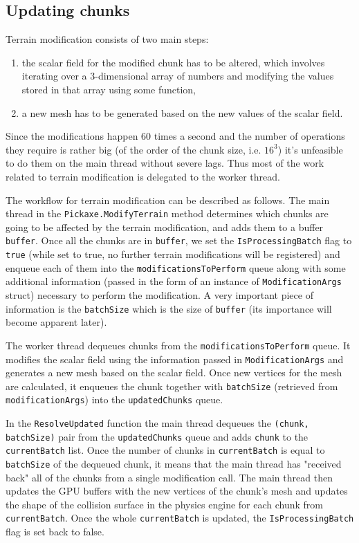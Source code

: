 \subsection{Updating chunks}
Terrain modification consists of two main steps:
\begin{enumerate}
    \item the scalar field for the modified chunk has to be altered, which involves iterating over a 3-dimensional array of numbers and modifying the values stored in that array using some function,
    \item a new mesh has to be generated based on the new values of the scalar field.
\end{enumerate}
Since the modifications happen 60 times a second and the number of operations they require is rather big (of the order of the chunk size, i.e. $16^3$) it's unfeasible to do them on the main thread without severe lags.
Thus most of the work related to terrain modification is delegated to the worker thread.

The workflow for terrain modification can be described as follows.
The main thread in the \texttt{Pickaxe.ModifyTerrain} method determines which chunks are going to be affected by the terrain modification, and adds them to a buffer \texttt{buffer}.
Once all the chunks are in \texttt{buffer}, we set the \texttt{IsProcessingBatch} flag to \texttt{true} (while set to true, no further terrain modifications will be registered) and enqueue each of them into the \texttt{modificationsToPerform} queue along with some additional information (passed in the form of an instance of \texttt{ModificationArgs} struct) necessary to perform the modification.
A very important piece of information is the \texttt{batchSize} which is the size of \texttt{buffer} (its importance will become apparent later).

The worker thread dequeues chunks from the \texttt{modificationsToPerform} queue.
It modifies the scalar field using the information passed in \texttt{ModificationArgs} and generates a new mesh based on the scalar field.
Once new vertices for the mesh are calculated, it enqueues the chunk together with \texttt{batchSize} (retrieved from \texttt{modificationArgs}) into the \texttt{updatedChunks} queue.

In the \texttt{ResolveUpdated} function the main thread dequeues the \texttt{(chunk, batchSize)} pair from the \texttt{updatedChunks} queue and adds \texttt{chunk} to the \texttt{currentBatch} list.
Once the number of chunks in \texttt{currentBatch} is equal to \texttt{batchSize} of the dequeued chunk, it means that the main thread has "received back" all of the chunks from a single modification call.
The main thread then updates the GPU buffers with the new vertices of the chunk's mesh and updates the shape of the collision surface in the physics engine for each chunk from \texttt{currentBatch}.
Once the whole \texttt{currentBatch} is updated, the \texttt{IsProcessingBatch} flag is set back to false.

